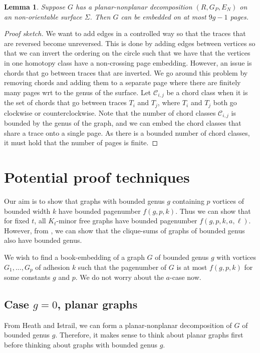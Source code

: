 \documentclass[]{report}
\newtheorem{lemma}[theorem]{Lemma}
\theoremstyle{definition}
\numberwithin{theorem}{section}
\numberwithin{equation}{section}
\begin{document}
\begin{lemma}\label{lem:planar_nonplanar_nonorientable}
	Suppose $G$ has a planar-nonplanar decomposition $(R, G_P, E_N)$ on an non-orientable surface $\Sigma$. Then $G$ can be embedded on at most $9g - 1$ pages.
\end{lemma}
\begin{proof}[Proof sketch]
We want to add edges in a controlled way so that the traces that are reversed become unreversed. This is done by adding edges between vertices so that we can invert the ordering on the circle such that we have that the vertices in one homotopy class have a non-crossing page embedding. However, an issue is chords that go between traces that are inverted. We go around this problem by removing chords and adding them to a separate page where there are finitely many pages wrt to the genus of the surface. Let $\mathcal{C}_{i,j}$ be a chord class when it is the set of chords that go between traces $T_i$ and $T_j$, where $T_i$ and $T_j$ both go clockwise or counterclockwise. Note that the number of chord classes $\mathcal{C}_{i,j}$ is bounded by the genus of the graph, and we can embed the chord classes that share a trace onto a single page. As there is a bounded number of chord classes, it must hold that the number of pages is finite. 
\end{proof}


\chapter{Potential proof techniques}\label{chap:Proving_The_Theorem}
Our aim is to show that graphs with bounded genus $g$ containing $p$ vortices of bounded width $k$ have bounded pagenumber $f(g, p, k)$. Thus we can show that for fixed $t$, all $K_t$-minor free graphs have bounded pagenumber $f(g, p, k, a, \ell)$. However, from \cite{hickingbothamStackNumberCliqueSum2023}, we can show that the clique-sums of graphs of bounded genus also have bounded genus.

We wish to find a book-embedding of a graph $G$ of bounded genus $g$ with vortices $G_1, ..., G_p$ of adhesion $k$ such that the pagenumber of $G$ is at most $f(g, p, k)$ for some constants $g$ and $p$. We do not worry about the $a$-case now.

\section{Case $g = 0$, planar graphs}
From Heath and Istrail, we can form a planar-nonplanar decomposition of $G$ of bounded genus $g$. Therefore, it makes sense to think about planar graphs first before thinking about graphs with bounded genus $g$.
\end{document}
